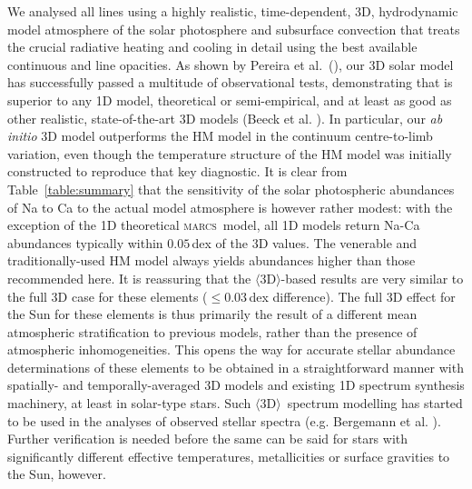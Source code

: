 \documentclass[traditabstract]{aa}
\newcommand{\oneDAV}{$\langle\mathrm{3D}\rangle$}
\newcommand{\marcs}{\textsc{marcs}}
\begin{document}
We analysed all lines using a highly realistic, time-dependent, 3D, hydrodynamic model atmosphere of the solar photosphere and subsurface convection that treats the crucial radiative heating and cooling in detail using the best available continuous and line opacities.  As shown by Pereira et al.\ (\cite{pereira_models}), our 3D solar model has successfully passed a multitude of observational tests, demonstrating that is superior to any 1D model, theoretical or semi-empirical, and at least as good as other realistic, state-of-the-art 3D models (Beeck et al. \cite{beeck2012}). In particular, our \textit{ab initio} 3D model outperforms the HM model in the continuum centre-to-limb variation, even though the temperature structure of the HM model was initially constructed to reproduce that key diagnostic. It is clear from Table~\ref{table:summary} that the sensitivity of the solar photospheric abundances of Na to Ca to the actual model atmosphere is however rather modest: with the exception of the 1D theoretical \marcs\ model, all 1D models return Na-Ca abundances typically within $0.05$\,dex of the 3D values.  The venerable and traditionally-used HM model always yields abundances higher than those recommended here. It is reassuring that the \oneDAV-based results are very similar to the full 3D case for these elements ($\le$$0.03$\,dex difference).  The full 3D effect for the Sun for these elements is thus primarily the result of a different mean atmospheric stratification to previous models, rather than the presence of atmospheric inhomogeneities.  This opens the way for accurate stellar abundance determinations of these elements to be obtained in a straightforward manner with spatially- and temporally-averaged 3D models and existing 1D spectrum synthesis machinery, at least in solar-type stars. Such \oneDAV\ spectrum modelling has started to be used in the analyses of observed stellar spectra (e.g. Bergemann et al. \cite{Bergemann2012}).  Further verification is needed before the same can be said for stars with significantly different effective temperatures, metallicities or surface gravities to the Sun, however.
\end{document}
